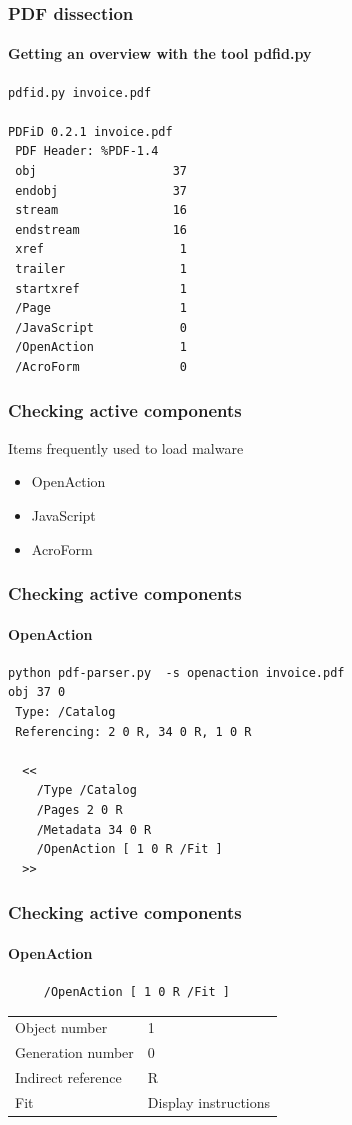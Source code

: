 \begin{frame}[fragile]
    \frametitle{PDF dissection}
    \framesubtitle{Getting an overview with the tool pdfid.py}
    \small
    \begin{lstlisting}
pdfid.py invoice.pdf

PDFiD 0.2.1 invoice.pdf
 PDF Header: %PDF-1.4
 obj                   37
 endobj                37
 stream                16
 endstream             16
 xref                   1
 trailer                1
 startxref              1
 /Page                  1
 /JavaScript            0
 /OpenAction            1
 /AcroForm              0
\end{lstlisting}
\end{frame}

\begin{frame}
    \frametitle{Checking active components}
    \begin{block}{Items frequently used to load malware}
        \begin{itemize}
            \item OpenAction
            \item JavaScript
            \item AcroForm
        \end{itemize}
    \end{block}
\end{frame}

\begin{frame}[fragile]
\frametitle{Checking active components}
\framesubtitle{OpenAction}
\begin{lstlisting}
python pdf-parser.py  -s openaction invoice.pdf
obj 37 0
 Type: /Catalog
 Referencing: 2 0 R, 34 0 R, 1 0 R

  <<
    /Type /Catalog
    /Pages 2 0 R
    /Metadata 34 0 R
    /OpenAction [ 1 0 R /Fit ]
  >>
\end{lstlisting}
\end{frame}

\begin{frame}[fragile]
    \frametitle{Checking active components}
    \framesubtitle{OpenAction}
    \begin{lstlisting}
     /OpenAction [ 1 0 R /Fit ]
    \end{lstlisting}

    \begin{tabular}{ll}
        Object number & 1\\
        Generation number & 0\\
        Indirect reference & R\\
        Fit & Display instructions\\
    \end{tabular}
\end{frame}

